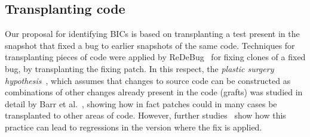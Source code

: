 \subsection{Transplanting code}


Our proposal for identifying BICs is based on transplanting a test present in the snapshot that fixed a bug to earlier snapshots of the same code. Techniques for transplanting pieces of code were applied by ReDeBug~\cite{jang2012redebug} for fixing clones of a fixed bug, by transplanting the fixing patch. In this respect, the \emph{plastic surgery hypothesis}~\cite{harman2010:automated_patching}, which assumes that changes to source code can be constructed as combinations of other changes already present in the code (grafts) was studied in detail by Barr et al.~\cite{barr2014plastic}, showing how in fact patches could in many cases be transplanted to other areas of code. However, further studies~\cite{castelluccio2019empirical} show how this practice can lead to regressions in the version where the fix is applied.

